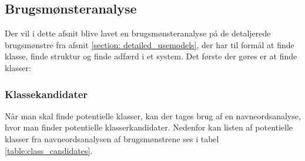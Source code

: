 \subsection{Brugsmønsteranalyse}
Der vil i dette afsnit blive lavet en brugsmønsteranalyse på de detaljerede brugsmønstre fra afsnit \ref{section: detailed_usemodels}, der har til formål at finde klasse, finde struktur og finde adfærd i et system. Det første der gøres er at finde klasser:

\subsubsection{Klassekandidater}
Når man skal finde potentielle klasser, kan der tages brug af en navneordsanalyse, hvor man finder potentielle klasserkandidater. Nedenfor kan listen af potentielle klasser fra navneordsanalysen af brugsmønstrene ses i tabel \ref{table:class_candidates}.

